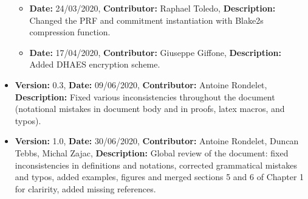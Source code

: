 \begin{itemize}
\begin{itemize}
            \item \textbf{Date:} 24/03/2020, \textbf{Contributor:} Raphael Toledo, \textbf{Description:} Changed the PRF and commitment instantiation with Blake2s compression function.
            \item \textbf{Date:} 17/04/2020, \textbf{Contributor:} Giuseppe Giffone, \textbf{Description:} Added DHAES encryption scheme.
        \end{itemize}
    \item \textbf{Version:} 0.3, \textbf{Date:} 09/06/2020, \textbf{Contributor:} Antoine Rondelet, \textbf{Description:} Fixed various inconsistencies throughout the document (notational mistakes in document body and in proofs, latex macros, and typos).
    \item \textbf{Version:} 1.0, \textbf{Date:} 30/06/2020, \textbf{Contributor:} Antoine Rondelet, Duncan Tebbs, Michal Zajac, \textbf{Description:} Global review of the document: fixed inconsistencies in definitions and notations, corrected grammatical mistakes and typos, added examples, figures and merged sections 5 and 6 of Chapter 1 for claririty, added missing references.
\end{itemize}
